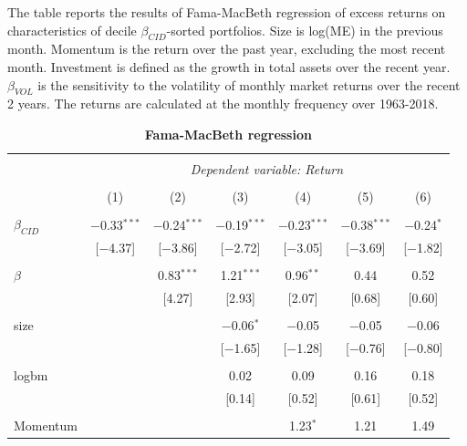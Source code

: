 \documentclass[12pt]{article}
\begin{document}
\begin{table}[!htbp] \centering 
  \caption{\textbf{Fama-MacBeth regression}} 
  \label{} 
  \begin{flushleft}
    {\medskip\small
The table reports the results of Fama-MacBeth regression of excess returns on characteristics of decile $\beta_{CID}$-sorted portfolios. Size is log(ME) in the previous month. Momentum is the return over the past year, excluding the most recent month. Investment is defined as the growth in total assets over the recent year. $\beta_{VOL}$ is the sensitivity to the volatility of monthly market returns over the recent 2 years. The returns are calculated at the monthly frequency over 1963-2018.}
    \medskip
    \end{flushleft}
\begin{tabular}{@{\extracolsep{5pt}}lcccccc} 
\\[-1.8ex]\hline 
\hline \\[-1.8ex] 
 & \multicolumn{6}{c}{\textit{Dependent variable: Return}} \\ 
\cline{2-7} 
\\[-1.8ex] & (1) & (2) & (3) & (4) & (5) & (6)\\ 
\hline \\[-1.8ex] 
 $\beta_{CID}$ & $-$0.33$^{***}$ & $-$0.24$^{***}$ & $-$0.19$^{***}$ & $-$0.23$^{***}$ & $-$0.38$^{***}$ & $-$0.24$^{*}$ \\ 
  & [$-$4.37] & [$-$3.86] & [$-$2.72] & [$-$3.05] & [$-$3.69] & [$-$1.82] \\ 
  & & & & & & \\ 
 $\beta$ &  & 0.83$^{***}$ & 1.21$^{***}$ & 0.96$^{**}$ & 0.44 & 0.52 \\ 
  &  & [4.27] & [2.93] & [2.07] & [0.68] & [0.60] \\ 
  & & & & & & \\ 
 size &  &  & $-$0.06$^{*}$ & $-$0.05 & $-$0.05 & $-$0.06 \\ 
  &  &  & [$-$1.65] & [$-$1.28] & [$-$0.76] & [$-$0.80] \\ 
  & & & & & & \\ 
 logbm &  &  & 0.02 & 0.09 & 0.16 & 0.18 \\ 
  &  &  & [0.14] & [0.52] & [0.61] & [0.52] \\ 
  & & & & & & \\ 
 Momentum &  &  &  & 1.23$^{*}$ & 1.21 & 1.49 \\ 

\end{tabular}
\end{table}
\end{document}
